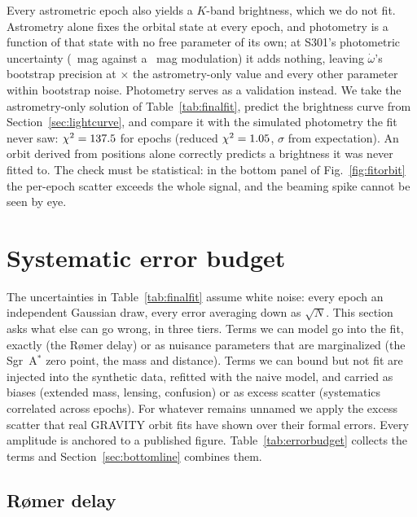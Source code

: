 \documentclass{aastex701}
\begin{document}
Every astrometric epoch also yields a $K$-band brightness, which we do not fit. Astrometry alone fixes the orbital state at every epoch, and photometry is a function of that state with no free parameter of its own; at S301's photometric uncertainty (\campaignSigmaDmag{}~mag against a \photcheckModelAmplitudeAtEpochs{}~mag modulation) it adds nothing, leaving $\dot\omega$'s bootstrap precision at \photcheckJointRatioOmegaDotDegYr{}$\times$ the astrometry-only value and every other parameter within bootstrap noise. Photometry serves as a validation instead. We take the astrometry-only solution of Table~\ref{tab:finalfit}, predict the brightness curve from Section~\ref{sec:lightcurve}, and compare it with the simulated photometry the fit never saw: $\chi^2 = 137.5{}$ for \photcheckNEpochs{} epochs (reduced $\chi^2 = 1.05{}$, \photcheckChiTwoNsigmaFromExpected{}$\sigma$ from expectation). An orbit derived from positions alone correctly predicts a brightness it was never fitted to. The check must be statistical: in the bottom panel of Fig.~\ref{fig:fitorbit} the per-epoch scatter exceeds the whole signal, and the beaming spike cannot be seen by eye.

\section{Systematic error budget}
\label{sec:budget}

The uncertainties in Table~\ref{tab:finalfit} assume white noise: every epoch an independent Gaussian draw, every error averaging down as $\sqrt{N}$. This section asks what else can go wrong, in three tiers. Terms we can model go into the fit, exactly (the R{\o}mer delay) or as nuisance parameters that are marginalized (the Sgr~A$^*$ zero point, the mass and distance). Terms we can bound but not fit are injected into the synthetic data, refitted with the naive model, and carried as biases (extended mass, lensing, confusion) or as excess scatter (systematics correlated across epochs). For whatever remains unnamed we apply the excess scatter that real GRAVITY orbit fits have shown over their formal errors. Every amplitude is anchored to a published figure. Table~\ref{tab:errorbudget} collects the terms and Section~\ref{sec:bottomline} combines them.

\subsection{R{\o}mer delay}
\label{sec:roemer}
\end{document}
